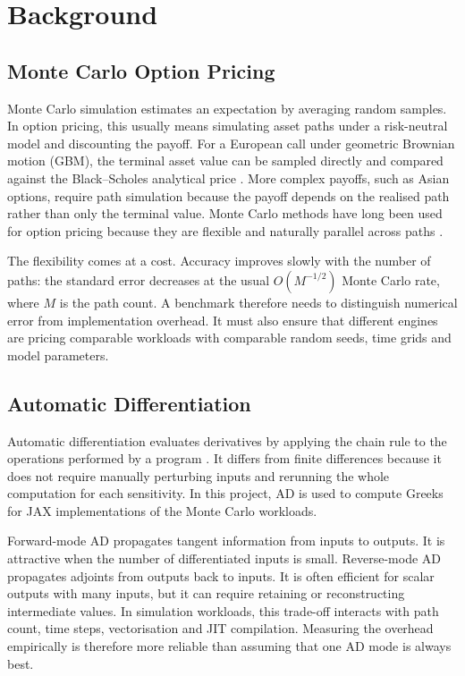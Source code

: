 \chapter{Background}
\label{chap:background}

\section{Monte Carlo Option Pricing}

Monte Carlo simulation estimates an expectation by averaging random samples. In option pricing, this usually means simulating asset paths under a risk-neutral model and discounting the payoff. For a European call under geometric Brownian motion (GBM), the terminal asset value can be sampled directly and compared against the Black--Scholes analytical price \cite{black1973pricing}. More complex payoffs, such as Asian options, require path simulation because the payoff depends on the realised path rather than only the terminal value. Monte Carlo methods have long been used for option pricing because they are flexible and naturally parallel across paths \cite{boyle1977options}.

The flexibility comes at a cost. Accuracy improves slowly with the number of paths: the standard error decreases at the usual \(O(M^{-1/2})\) Monte Carlo rate, where \(M\) is the path count. A benchmark therefore needs to distinguish numerical error from implementation overhead. It must also ensure that different engines are pricing comparable workloads with comparable random seeds, time grids and model parameters.

\section{Automatic Differentiation}

Automatic differentiation evaluates derivatives by applying the chain rule to the operations performed by a program \cite{griewank2008evaluating,baydin2018automatic}. It differs from finite differences because it does not require manually perturbing inputs and rerunning the whole computation for each sensitivity. In this project, AD is used to compute Greeks for JAX implementations of the Monte Carlo workloads.

Forward-mode AD propagates tangent information from inputs to outputs. It is attractive when the number of differentiated inputs is small. Reverse-mode AD propagates adjoints from outputs back to inputs. It is often efficient for scalar outputs with many inputs, but it can require retaining or reconstructing intermediate values. In simulation workloads, this trade-off interacts with path count, time steps, vectorisation and JIT compilation. Measuring the overhead empirically is therefore more reliable than assuming that one AD mode is always best.

